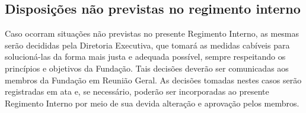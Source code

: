     \subsection{Disposições não previstas no regimento interno}
        Caso ocorram situações não previstas no presente Regimento Interno, as mesmas serão decididas pela Diretoria Executiva, que tomará as medidas cabíveis para solucioná-las da forma mais justa e adequada possível, sempre respeitando os princípios e objetivos da Fundação. Tais decisões deverão ser comunicadas aos membros da Fundação em Reunião Geral.
        As decisões tomadas nestes casos serão registradas em ata e, se necessário, poderão ser incorporadas ao presente Regimento Interno por meio de sua devida alteração e aprovação pelos membros.
